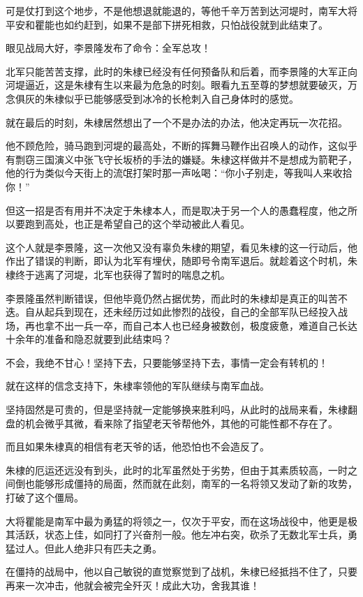 \begin{multicols}{\theparacolNo}
		可是仗打到这个地步，不是他想退就能退的，等他千辛万苦到达河堤时，南军大将平安和瞿能也如约赶到，如果不是部下拼死相救，只怕战役就到此结束了。

		眼见战局大好，李景隆发布了命令：全军总攻！

		北军只能苦苦支撑，此时的朱棣已经没有任何预备队和后着，而李景隆的大军正向河堤逼近，这是朱棣有生以来最为危急的时刻。眼看九五至尊的梦想就要破灭，万念俱灰的朱棣似乎已能够感受到冰冷的长枪刺入自己身体时的感觉。

		就在最后的时刻，朱棣居然想出了一个不是办法的办法，他决定再玩一次花招。

		他不顾危险，骑马跑到河堤的最高处，不断的挥舞马鞭作出召唤人的动作，这似乎有剽窃三国演义中张飞守长坂桥的手法的嫌疑。朱棣这样做并不是想成为箭靶子，他的行为类似今天街上的流氓打架时那一声吆喝：“你小子别走，等我叫人来收拾你！”

		但这一招是否有用并不决定于朱棣本人，而是取决于另一个人的愚蠢程度，他之所以要跑到高处，也正是希望自己的这个举动被此人看见。

		这个人就是李景隆，这一次他又没有辜负朱棣的期望，看见朱棣的这一行动后，他作出了错误的判断，即认为北军有埋伏，随即号令南军退后。就趁着这个时机，朱棣终于逃离了河堤，北军也获得了暂时的喘息之机。

		李景隆虽然判断错误，但他毕竟仍然占据优势，而此时的朱棣却是真正的叫苦不迭。自从起兵到现在，还未经历过如此惨烈的战役，自己的全部军队已经投入战场，再也拿不出一兵一卒，而自己本人也已经身被数创，极度疲惫，难道自己长达十余年的准备和隐忍就要到此结束吗？

		不会，我绝不甘心！坚持下去，只要能够坚持下去，事情一定会有转机的！

		就在这样的信念支持下，朱棣率领他的军队继续与南军血战。

		坚持固然是可贵的，但是坚持就一定能够换来胜利吗，从此时的战局来看，朱棣翻盘的机会微乎其微，看来除了指望老天爷帮他外，其他的可能性都不存在了。

		而且如果朱棣真的相信有老天爷的话，他恐怕也不会造反了。

		朱棣的厄运还远没有到头，此时的北军虽然处于劣势，但由于其素质较高，一时之间倒也能够形成僵持的局面，然而就在此刻，南军的一名将领又发动了新的攻势，打破了这个僵局。

		大将瞿能是南军中最为勇猛的将领之一，仅次于平安，而在这场战役中，他更是极其活跃，状态上佳，如同打了兴奋剂一般。他左冲右突，砍杀了无数北军士兵，勇猛过人。但此人绝非只有匹夫之勇。

		在僵持的战局中，他以自己敏锐的直觉察觉到了战机，朱棣已经抵挡不住了，只要再来一次冲击，他就会被完全歼灭！成此大功，舍我其谁！


\end{multicols}

